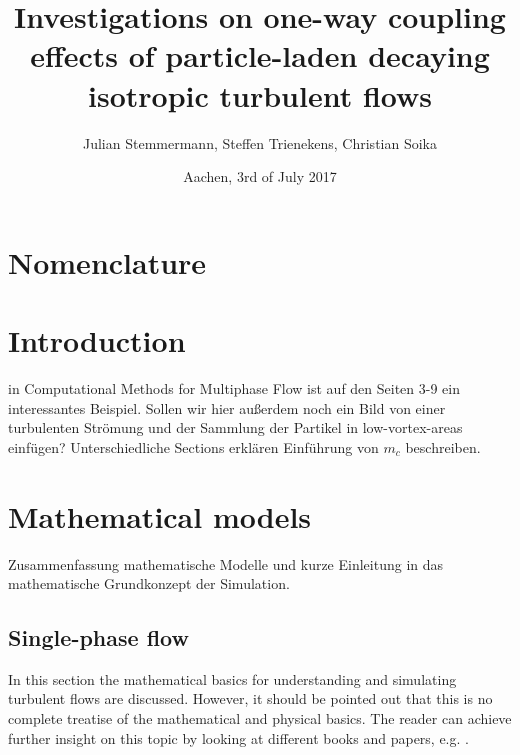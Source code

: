 \documentclass[a4paper,10pt]{article}
\title{Investigations on one-way coupling effects of particle-laden decaying isotropic turbulent flows}
\author{Julian Stemmermann, Steffen Trienekens, Christian Soika}
\date{Aachen, 3rd of July 2017}
\numberwithin{equation}{section} %
\begin{document}
\maketitle

\setlength{\columnsep}{30pt}

\pagebreak

\tableofcontents{} %
 
\pagebreak

\section{Nomenclature}
\begin{multicols}{2}
\setlength{\columnseprule}{1pt}
\printnomenclature
\end{multicols}
\pagebreak

\section{Introduction}
in Computational Methods for Multiphase Flow ist auf den Seiten 3-9 ein interessantes Beispiel.
Sollen wir hier außerdem noch ein Bild von einer turbulenten Strömung und der Sammlung der Partikel in low-vortex-areas einfügen?
Unterschiedliche Sections erklären
Einführung von $m_c$ beschreiben. 
\pagebreak
\section{Mathematical models}
Zusammenfassung mathematische Modelle und kurze Einleitung in das mathematische Grundkonzept der Simulation.
\subsection{Single-phase flow} %
In this section the mathematical basics for understanding and simulating turbulent flows are discussed. However, it should be pointed out that this is no
complete treatise of the mathematical and physical basics. The reader can achieve further insight on this topic by looking at different books and papers, 
e.g. \cite{turbulentFlows}.
\newline
\end{document}
